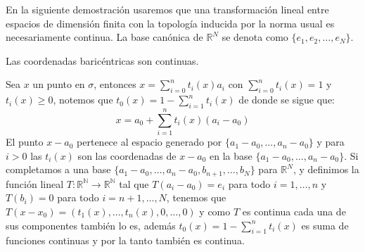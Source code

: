 En la siguiente demostración usaremos que una transformación lineal
entre espacios de dimensión finita con la topología inducida por la
norma usual es necesariamente continua. La base canónica de
$\mathbb{R}^N$ se denota como $\{e_1,e_2,\ldots,e_N\}$.

\begin{Prop}
Las coordenadas baricéntricas son continuas.
\end{Prop}
\begin{Dem}

Sea $x$ un punto en $\sigma$, entonces $x=\sum_{i=0}^{n}t_i(x)a_i$ con $\sum_{i=0}^{n}t_i(x)=1$ y 
$t_i(x)\geq 0$, notemos que $t_0(x) = 1-\sum_{i=1}^{n}t_i(x)$ de donde se sigue que:
\begin{equation}
 x = a_0 + \sum_{i=1}^{n}t_i(x)(a_i-a_0)
\end{equation}
El punto $x-a_0$ pertenece al espacio generado por $\{a_1-a_0,\ldots,a_n-a_0\}$ y para $i>0$ las $t_i(x)$  son las coordenadas de $x-a_0$ en la base $\{a_1-a_0,\ldots,a_n-a_0\}$. Si completamos a una base $\{a_1-a_0,\ldots,a_n-a_0,b_{n+1},\ldots,b_N\}$ para $\mathbb{R}^N$,  y definimos la función lineal $T\colon \mathbb{R^N}\rightarrow \mathbb{R^N}$ tal que $T(a_i-a_0) = e_i$ para todo $i=1,\ldots,n$ y $T(b_i) = 0$ para todo $i = n+1,\ldots,N$, tenemos que $T(x-x_0) = (t_1(x),\ldots,t_n(x),0,\ldots,0)$ y como $T$ es continua cada una de sus componentes también lo es, además $t_0(x) = 1-\sum_{i=1}^{n}t_i(x)$ es suma de funciones continuas y por la tanto también es continua. 
\end{Dem}
%
